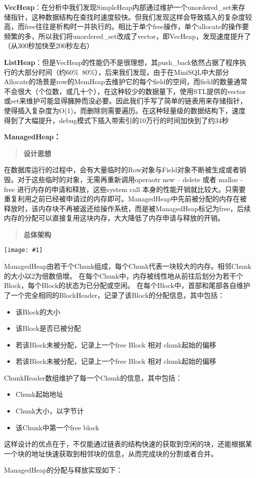 \documentclass[12pt, a4paper]{article}
\def\b#1{\textbf{#1}}
\def\p{\par}
\def\g#1{\begin{center}\texttt{[image: \#1]}\end{center}}
\def\q#1{\begin{quote}\b{#1}\end{quote}}
\begin{document}
\p \b{VecHeap}：在分析中我们发现SimpleHeap内部通过维护一个unordered\_set来存储指针，这种数据结构在查找时速度较快。但我们发现这样会导致插入的复杂度较高，而free往往是析构时一并执行的。相比于单个free操作，单个allocate的操作要频繁的多，所以我们将unordered\_set改成了vector，即VecHeap，发现速度提升了（从300秒加快至200秒左右）
\p \b{ListHeap}：但是VecHeap的性能仍不是很理想，其push\_back依然占据了程序执行的大部分时间（约60\%~80\%），后来我们发现，由于在MiniSQL中大部分Allocate的场景是row的MemHeap去维护它的每个field的空间，而field的数量通常不会很大（个位数，或几十个），在这种较少的数据量下，使用STL提供的vector或set来维护可能显得臃肿而没必要。因此我们手写了简单的链表用来存储指针，使得插入复杂度为O(1)，而删除则需要遍历。在这种轻量级的数据结构下，速度得到了大幅提升，debug模式下插入带索引的10万行的时间加快到了约34秒
\p \b{ManagedHeap：}
\q{设计思想}
\p 在数据库运行的过程中，会有大量临时的Row对象与Field对象不断被生成或者销毁。对于这些临时的对象，无需再重新调用operaotr new – delete 或者 malloc - free 进行内存的申请和释放，这些system call 本身的性能开销就比较大。只需要重复利用之前已经被申请过的内存即可。ManagedHeap中先前被分配的内存在被释放时，该内存块不再被返还给操作系统，而是被ManagedHeap标记为free，后续内存的分配可以直接复用这块内存，大大降低了内存申请与释放的开销。
\q{总体架构}
\g{managedHeap.pdf}
\p ManagedHeap由若干个Chunk组成，每个Chunk代表一块较大的内存。相邻Chunk的大小以2为倍数倍增。
在每个Chunk中，内存被线性地从前往后划分为若干个Block，每个Block的状态为已分配或空闲。
在每个Block中，首部和尾部各自维护了一个完全相同的BlockHeader，记录了该Block的分配信息，其中包括：
\begin{itemize}
  \item 该Block的大小
  \item 该Block是否已被分配
  \item 若该Block未被分配，记录上一个free Block 相对 chunk起始的偏移
  \item 若该Block未被分配，记录上一个free Block 相对 chunk起始的偏移
\end{itemize}
\p ChunkHeader数组维护了每一个Chunk的信息，其中包括：
\begin{itemize}
  \item Chunk起始地址
  \item Chunk大小，以字节计
  \item 该Chunk中第一个free block
\end{itemize}
\p 这样设计的优点在于，不仅能通过链表的结构快速的获取到空闲的块，还能根据某一个块的地址快速获取到相邻块的信息，从而完成块的分割或者合并。
\p ManagedHeap的分配与释放实现如下：
\end{document}
